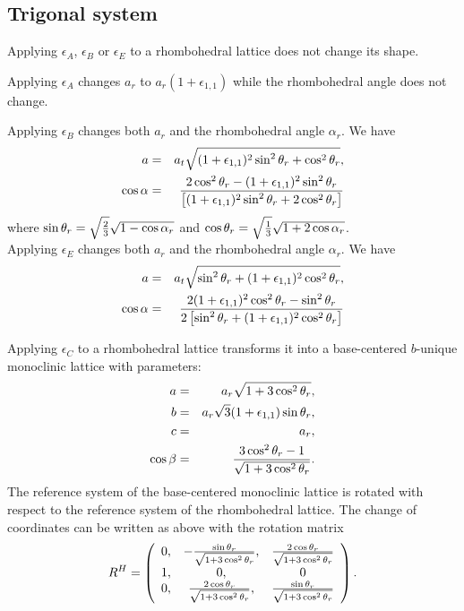 \documentclass[12pt,a4paper,twoside]{report}
\begin{document}
{\color{web-blue}\subsection{Trigonal system}}
\color{black}

Applying $\epsilon_A$, $\epsilon_B$ or $\epsilon_E$ to a rhombohedral 
lattice does not change its shape. 

Applying $\epsilon_A$ changes $a_r$ to $a_r (1+\epsilon_{1,1})$ while the
rhombohedral angle does not change.

Applying $\epsilon_B$ changes both $a_r$ and the rhombohedral angle 
$\alpha_r$. We have 
\begin{eqnarray}
a&=&a_t \sqrt{(1 + \epsilon_{1,1})^2 \sin^2\theta_r + \cos^2\theta_r}, \\
\cos\alpha &=& {
2 \cos^2\theta_r -(1 + \epsilon_{1,1})^2 \sin^2\theta_r  \over
 \left[(1 + \epsilon_{1,1})^2 \sin^2\theta_r+ 2 \cos^2\theta_r\right]}
\end{eqnarray}
where 
$\sin{\theta_r}=\sqrt{2\over 3}\sqrt{1-\cos{\alpha_r}}$
and $\cos{\theta_r}=\sqrt{1\over 3}\sqrt{1 + 2 \cos{\alpha_r}}$. \\

Applying $\epsilon_E$ changes both $a_r$ and the rhombohedral angle
$\alpha_r$. We have 
\begin{eqnarray}
a&=&a_t \sqrt{\sin^2\theta_r + (1 + \epsilon_{1,1})^2 \cos^2\theta_r}, \\
\cos\alpha &=& {
2(1 + \epsilon_{1,1})^2 \cos^2\theta_r -\sin^2\theta_r  \over
2 \left[\sin^2\theta_r+ (1 + \epsilon_{1,1})^2 \cos^2\theta_r\right]}
\end{eqnarray}

Applying $\epsilon_C$ to a rhombohedral lattice transforms it into a
base-centered $b$-unique monoclinic lattice with parameters:
\begin{eqnarray}
a&=&a_r \sqrt{1 + 3 \cos^2 \theta_r}, \\
b&=&a_r \sqrt{3} (1 + \epsilon_{1,1}) \sin \theta_r, \\
c&=&a_r, \\
\cos\beta &=& {3 \cos^2 \theta_r -1 \over \sqrt{1 + 3 \cos^2 \theta_r} }.
\end{eqnarray}
The reference system of the base-centered monoclinic lattice is rotated 
with respect to the reference system of the rhombohedral lattice.
The change of coordinates can be written as above with the rotation matrix 
\begin{equation}
R^H=\left( \begin{array}{ccc}
0, & -{\sin\theta_r \over \sqrt{1 + 3 \cos^2 \theta_r}}, &  {2\cos\theta_r \over \sqrt{1 + 3 \cos^2 \theta_r}}\\
1, & 0, & 0  
\\
0, & {2\cos\theta_r \over \sqrt{1 + 3 \cos^2 \theta_r}}, & 
{\sin\theta_r \over \sqrt{1 + 3 \cos^2 \theta_r}} 
\end{array}
\right).
\end{equation}
\end{document}
